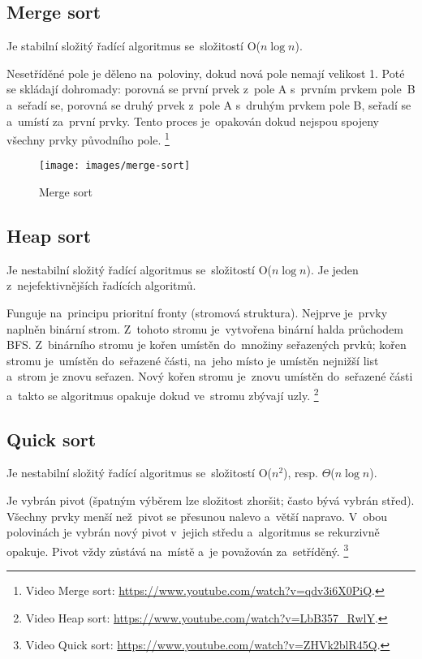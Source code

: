 \subsection{Merge sort}

Je stabilní složitý řadící algoritmus se~složitostí O(\( n\log{n} \)).

Nesetříděné pole je děleno na~poloviny, dokud nová pole nemají velikost 1. Poté se skládají dohromady: porovná se první prvek z~pole A s~prvním prvkem pole~B a~seřadí se, porovná se druhý prvek z~pole A s~druhým prvkem pole B, seřadí se a~umístí za~první prvky. Tento proces je~opakován dokud nejspou spojeny všechny prvky původního pole.%
\footnote{Video Merge sort: \url{https://www.youtube.com/watch?v=qdv3i6X0PiQ}.}

\begin{figure}[ht]
	\centering
	\texttt{[image: images/merge-sort]}
	\caption{Merge sort}
\end{figure}

\subsection{Heap sort}

Je nestabilní složitý řadící algoritmus se~složitostí O(\( n\log{n} \)). Je jeden z~nejefektivnějších řadících algoritmů.

Funguje na~principu prioritní fronty (stromová struktura). Nejprve je~prvky naplněn binární strom. Z~tohoto stromu je~vytvořena binární halda průchodem BFS. Z~binárního stromu je kořen umístěn do~množiny seřazených prvků; kořen stromu je~umístěn do~seřazené části, na~jeho místo je umístěn nejnižší list a~strom je znovu seřazen. Nový kořen stromu je~znovu umístěn do~seřazené části a~takto se algoritmus opakuje dokud ve~stromu zbývají uzly.%
\footnote{Video Heap sort: \url{https://www.youtube.com/watch?v=LbB357_RwlY}.}

\subsection{Quick sort}

Je nestabilní složitý řadící algoritmus se~složitostí O(\( n^2 \)), resp. \( \Theta \)(\( n\log{n} \)).

Je vybrán pivot (špatným výběrem lze složitost zhoršit; často bývá vybrán střed). Všechny prvky menší než~pivot se přesunou nalevo a~větší napravo. V~obou polovinách je vybrán nový pivot v~jejich středu a~algoritmus se rekurzivně opakuje. Pivot vždy zůstává na~místě a~je považován za~setříděný.%
\footnote{Video Quick sort: \url{https://www.youtube.com/watch?v=ZHVk2blR45Q}.}

